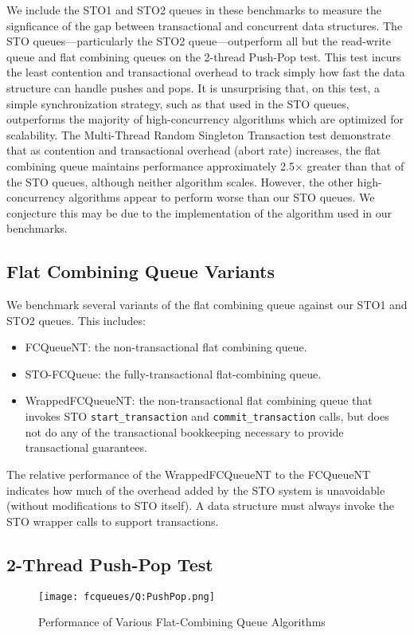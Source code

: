 We include the STO1 and STO2 queues in these benchmarks to measure the signficance of the gap between transactional and concurrent data structures. The STO queues---particularly the STO2 queue---outperform all but the read-write queue and flat combining queues on the 2-thread Push-Pop test. This test incurs the least contention and transactional overhead to track simply how fast the data structure can handle pushes and pops. It is unsurprising that, on this test, a simple synchronization strategy, such as that used in the STO queues, outperforms the majority of high-concurrency algorithms which are optimized for scalability. The Multi-Thread Random Singleton Transaction test demonstrate that as contention and transactional overhead (abort rate) increases, the flat combining queue maintains performance approximately 2.5$\times$ greater than that of the STO queues, although neither algorithm scales. However, the other high-concurrency algorithms appear to perform worse than our STO queues. We conjecture this may be due to the implementation of the algorithm used in our benchmarks\cite{libcds}.

\subsection{Flat Combining Queue Variants}

We benchmark several variants of the flat combining queue against our STO1 and STO2 queues. This includes:
\begin{itemize}
    \item FCQueueNT: the non-transactional flat combining queue.
    \item STO-FCQueue: the fully-transactional flat-combining queue.
    \item WrappedFCQueueNT: the non-transactional flat combining queue that invokes STO \texttt{start\_transaction} and \texttt{commit\_transaction} calls, but does not do any of the transactional bookkeeping necessary to provide transactional guarantees.
\end{itemize}

The relative performance of the WrappedFCQueueNT to the FCQueueNT indicates how much of the overhead added by the STO system is unavoidable (without modifications to STO itself). A data structure must always invoke the STO wrapper calls to support transactions. 

\iffalse
\subsection{2-Thread Push-Pop Test}
\begin{figure}[ht!]
\centering
\texttt{[image: fcqueues/Q:PushPop.png]}
\caption{Performance of Various Flat-Combining Queue Algorithms}
\label{fig:fcqueues_queues}
\end{figure}

